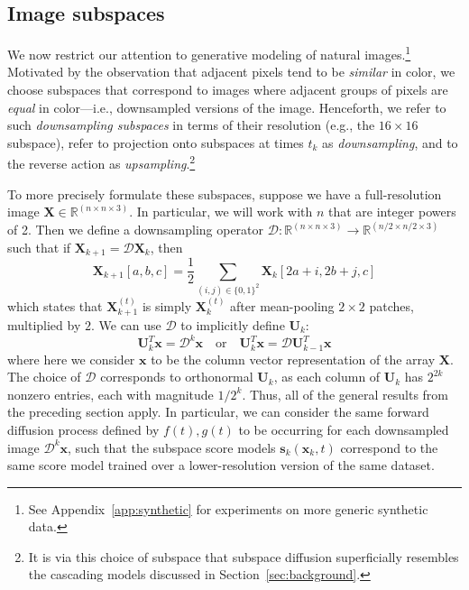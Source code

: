 \documentclass{article}
\begin{document}
\subsection{Image subspaces}

We now restrict our attention to generative modeling of natural images.\footnote{See Appendix~\ref{app:synthetic} for experiments on more generic synthetic data.} Motivated by the observation that adjacent pixels tend to be \emph{similar} in color, we choose subspaces that correspond to images where adjacent groups of pixels are \emph{equal} in color---i.e., downsampled versions of the image. Henceforth, we refer to such \emph{downsampling subspaces} in terms of their resolution (e.g., the $16\times 16$ subspace), refer to projection onto subspaces at times $t_k$ as \emph{downsampling}, and to the reverse action as \emph{upsampling}.\footnote{It is via this choice of subspace that subspace diffusion superficially resembles the cascading models discussed in Section~\ref{sec:background}.}

To more precisely formulate these subspaces, suppose we have a full-resolution image $\mathbf{X} \in \mathbb{R}^{(n \times n \times 3)}$. In particular, we will work with $n$ that are integer powers of 2. Then we define a downsampling operator $\mathcal{D}: \mathbb{R}^{(n \times n \times 3)} \rightarrow \mathbb{R}^{(n/2 \times n/2 \times 3)}$ such that if $\mathbf{X}_{k+1} = \mathcal{D}\mathbf{X}_k$, then
\begin{equation} \label{eq:downsample}
    \mathbf{X}_{k+1}[a, b, c] = \frac{1}{2}\sum_{(i,j)\in \{0,1\}^2} \mathbf{X}_k[2a+i, 2b+j, c]
\end{equation}
which states that $\mathbf{X}_{k+1}^{(t)}$ is simply $\mathbf{X}_k^{(t)}$ after mean-pooling $2 \times 2$ patches, multiplied by $2$. We can use $\mathcal{D}$ to implicitly define $\mathbf{U}_k$:
\begin{equation} \label{eq:uk}
    \mathbf{U}_k^T \mathbf{x} = \mathcal{D}^k\mathbf{x} \quad \text{or} \quad \mathbf{U}_k^T \mathbf{x} = \mathcal{D}\mathbf{U}_{k-1}^T\mathbf{x}
\end{equation}
where here we consider $\mathbf{x}$ to be the column vector representation of the array $\mathbf{X}$. The choice of $\mathcal{D}$ corresponds to orthonormal $\mathbf{U}_k$, as each column of $\mathbf{U}_k$ has $2^{2k}$ nonzero entries, each with magnitude $1/2^k$. Thus, all of the general results from the preceding section apply. In particular, we can consider the same forward diffusion process defined by $f(t), g(t)$ to be occurring for each downsampled image $\mathcal{D}^k\mathbf{x}$, such that the subspace score models  $\mathbf{s}_k(\mathbf{x}_k, t)$ correspond to the same score model trained over a {lower-resolution} version of the same dataset.
\end{document}
